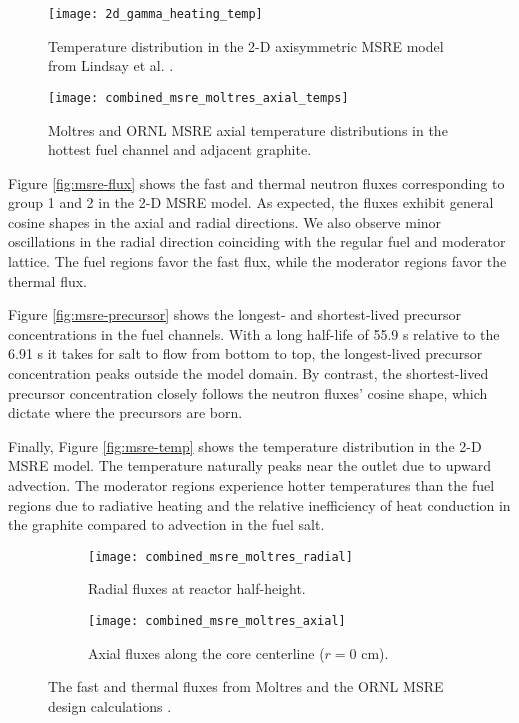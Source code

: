 \begin{figure}[htb!]
	\centering
	\begin{minipage}[b]{0.45\columnwidth}
	    \texttt{[image: 2d\_gamma\_heating\_temp]}
	    \caption{Temperature distribution in the 2-D
	    axisymmetric \gls{MSRE} model from Lindsay et al.
	    \cite{lindsay_introduction_2018}.}
	    \label{fig:msre-temp}
	\end{minipage}
	\hfill
	\begin{minipage}[b]{0.45\columnwidth}
	    \texttt{[image: combined\_msre\_moltres\_axial\_temps]}
	    \caption{Moltres \cite{lindsay_introduction_2018} and \gls{ORNL}
	    \gls{MSRE} \cite{briggs_molten-salt_1964} axial temperature
	    distributions in the hottest fuel channel and adjacent graphite.}
	    \label{fig:msre-temp-plot}
	\end{minipage}
\end{figure}

Figure \ref{fig:msre-flux} shows the fast and thermal neutron fluxes
corresponding to group 1 and 2 in the 2-D \gls{MSRE} model. As expected, the
fluxes exhibit general cosine shapes in the axial and radial directions. We
also observe minor oscillations in the radial direction coinciding with the
regular fuel and moderator lattice. The fuel regions favor the fast flux, while
the moderator regions favor the thermal flux.

Figure \ref{fig:msre-precursor}
shows the longest- and shortest-lived precursor concentrations in the fuel
channels. With a long half-life of 55.9 s relative to the 6.91 s it takes for
salt to flow from bottom to top, the longest-lived precursor concentration peaks
outside the model domain. By contrast, the shortest-lived precursor
concentration closely follows the neutron fluxes' cosine shape, which
dictate where the precursors are born.

Finally, Figure \ref{fig:msre-temp}
shows the temperature distribution in the 2-D \gls{MSRE} model. The temperature
naturally peaks near the outlet due to upward advection. The moderator regions
experience hotter temperatures than the fuel regions due to radiative heating
and the relative inefficiency of heat conduction in the graphite compared to
advection in the fuel salt.

\begin{figure}[htb!]
	\centering
	\begin{subfigure}[h]{0.45\columnwidth}
	    \texttt{[image: combined\_msre\_moltres\_radial]}
	    \caption{Radial fluxes at reactor half-height.}
	    \label{fig:msre-flux-radial}
	\end{subfigure}
	\hfill
	\begin{subfigure}[h]{0.45\columnwidth}
	    \texttt{[image: combined\_msre\_moltres\_axial]}
	    \caption{Axial fluxes along the core centerline ($r=0$ cm).}
	    \label{fig:msre-flux-axial}
	\end{subfigure}
	\caption{The fast and thermal fluxes from
	Moltres \cite{lindsay_introduction_2018} and the \gls{ORNL} \gls{MSRE}
	design calculations \cite{briggs_molten-salt_1964}.}
\end{figure}

